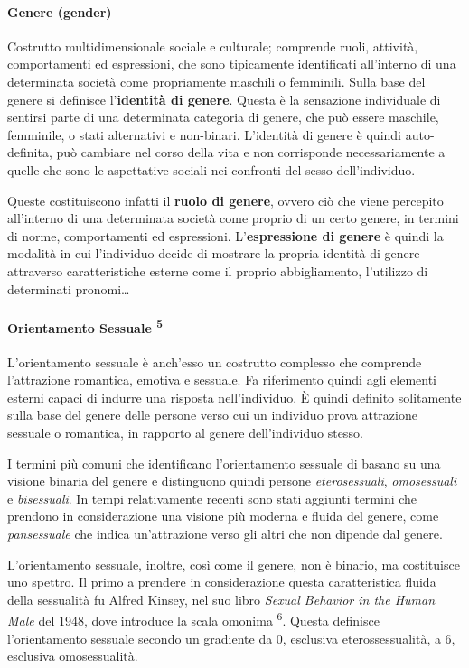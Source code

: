 \documentclass[11pt]{article}
\makeatletter
\newcommand{\cslcitation}[2]
 {\protect\hyper@linkstart{cite}{citeproc_bib_item_#1}#2\hyper@linkend}
\makeatother
\begin{document}
\paragraph{Genere (gender)}
\label{sec:org0eb4b8b}
Costrutto multidimensionale sociale e culturale; comprende ruoli, attività, comportamenti ed espressioni, che sono tipicamente identificati all'interno di una determinata società come propriamente maschili o femminili.
Sulla base del genere si definisce l'\textbf{identità di genere}.
Questa è la sensazione individuale di sentirsi parte di una determinata categoria di genere, che può essere maschile, femminile, o stati alternativi e non-binari.
L'identità di genere è quindi auto-definita, può cambiare nel corso della vita e non corrisponde necessariamente a quelle che sono le aspettative sociali nei confronti del sesso dell'individuo.

Queste costituiscono infatti il \textbf{ruolo di genere}, ovvero ciò che viene percepito all'interno di una determinata società come proprio di un certo genere, in termini di norme, comportamenti ed espressioni.
L'\textbf{espressione di genere} è quindi la modalità in cui l'individuo decide di mostrare la propria identità di genere attraverso caratteristiche esterne come il proprio abbigliamento, l'utilizzo di determinati pronomi\ldots{}
\paragraph{Orientamento Sessuale \textsuperscript{\cslcitation{5}{5}}}
\label{sec:orgbefe13f}
L'orientamento sessuale è anch'esso un costrutto complesso che comprende l'attrazione romantica, emotiva e sessuale.
Fa riferimento quindi agli elementi esterni capaci di indurre una risposta nell'individuo.
È quindi definito solitamente sulla base del genere delle persone verso cui un individuo prova attrazione sessuale o romantica, in rapporto al genere dell'individuo stesso.

I termini più comuni che identificano l'orientamento sessuale di basano su una visione binaria del genere e distinguono quindi persone \emph{eterosessuali}, \emph{omosessuali} e \emph{bisessuali}.
In tempi relativamente recenti sono stati aggiunti termini che prendono in considerazione una visione più moderna e fluida del genere, come \emph{pansessuale} che indica un'attrazione verso gli altri che non dipende dal genere.

L'orientamento sessuale, inoltre, così come il genere, non è binario, ma costituisce uno spettro.
Il primo a prendere in considerazione questa caratteristica fluida della sessualità fu Alfred Kinsey, nel suo libro \emph{Sexual Behavior in the Human Male} del 1948, dove introduce la scala omonima \textsuperscript{\cslcitation{6}{6}}.
Questa definisce l'orientamento sessuale secondo un gradiente da 0, esclusiva eterossessualità, a 6, esclusiva omosessualità.
\end{document}
